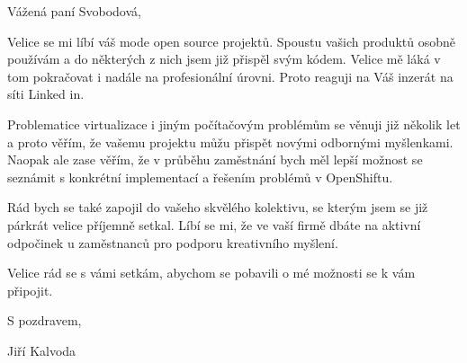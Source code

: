 \documentclass{article}
\author{Jiří Kalvoda}
\date{}
\title{}
\begin{document}
Vážená paní Svobodová,

Velice se mi líbí váš mode open source projektů. Spoustu vašich produktů osobně
používám a do některých z nich jsem již přispěl svým kódem. Velice mě láká v tom
pokračovat i nadále na profesionální úrovni. Proto reaguji na Váš inzerát
 na síti
Linked in.

Problematice virtualizace i jiným počítačovým problémům se věnuji již několik
let a proto věřím, že vašemu projektu můžu přispět novými odbornými myšlenkami.
Naopak ale zase věřím, že v průběhu zaměstnání bych měl lepší možnost se
seznámit s konkrétní implementací a řešením problémů v  OpenShiftu.

Rád bych se také zapojil do vašeho skvělého kolektivu, se kterým jsem se již
párkrát velice příjemně setkal. Líbí se mi, že ve vaší firmě dbáte na aktivní
odpočinek u zaměstnanců pro podporu kreativního myšlení.

Velice rád se s vámi setkám, abychom se pobavili o mé možnosti se k vám
připojit.


S pozdravem,

\hfil Jiří Kalvoda \hfil\hfil
\end{document}
